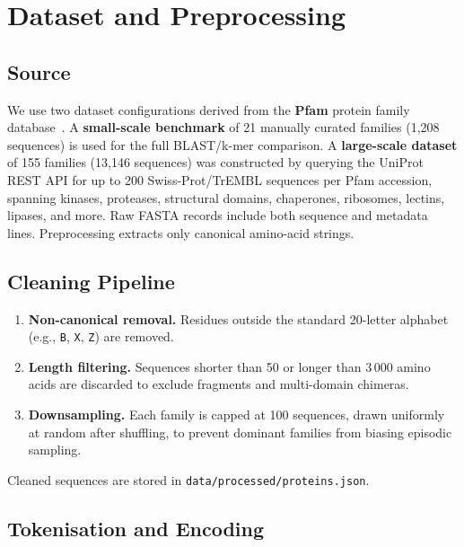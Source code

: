 \documentclass[11pt,a4paper]{article}
\begin{document}
\section{Dataset and Preprocessing}
\label{sec:data}

\subsection{Source}

We use two dataset configurations derived from the \textbf{Pfam} protein family
database~\cite{mistry2021pfam}.  A \textbf{small-scale benchmark} of 21 manually
curated families (1,208 sequences) is used for the full BLAST/k-mer comparison.
A \textbf{large-scale dataset} of 155 families (13,146 sequences) was constructed
by querying the UniProt REST API for up to 200 Swiss-Prot/TrEMBL sequences per
Pfam accession, spanning kinases, proteases, structural domains, chaperones,
ribosomes, lectins, lipases, and more.  Raw FASTA records include both sequence
and metadata lines.  Preprocessing extracts only canonical amino-acid strings.

\subsection{Cleaning Pipeline}

\begin{enumerate}[leftmargin=*,noitemsep]
  \item \textbf{Non-canonical removal.} Residues outside the standard 20-letter
        alphabet (e.g., \texttt{B}, \texttt{X}, \texttt{Z}) are removed.
  \item \textbf{Length filtering.} Sequences shorter than 50 or longer than
        3\,000 amino acids are discarded to exclude fragments and multi-domain
        chimeras.
  \item \textbf{Downsampling.} Each family is capped at 100 sequences, drawn
        uniformly at random after shuffling, to prevent dominant families from
        biasing episodic sampling.
\end{enumerate}

Cleaned sequences are stored in \texttt{data/processed/proteins.json}.

\subsection{Tokenisation and Encoding}
\end{document}
